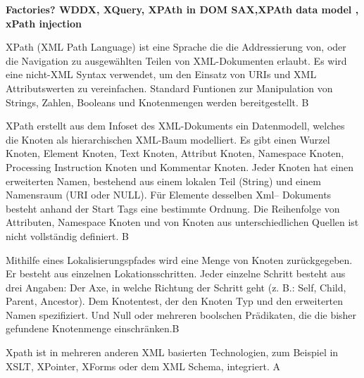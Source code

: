 \textbf{Factories? WDDX, XQuery, XPAth in DOM SAX,XPAth data model , xPath injection}

XPath (XML Path Language) ist eine Sprache die die Addressierung von, oder die Navigation zu ausgewählten Teilen von XML-Dokumenten erlaubt. Es wird eine nicht-XML Syntax verwendet, um den Einsatz von URIs und XML Attributswerten zu vereinfachen. Standard Funtionen zur Manipulation von Strings, Zahlen, Booleans und Knotenmengen werden bereitgestellt. B

XPath erstellt aus dem Infoset des XML-Dokuments ein Datenmodell, welches die Knoten als hierarchischen XML-Baum modelliert. Es gibt einen Wurzel Knoten, Element Knoten, Text Knoten, Attribut Knoten, Namespace Knoten, Processing Instruction Knoten und Kommentar Knoten. Jeder Knoten hat einen erweiterten Namen, bestehend aus einem lokalen Teil (String) und einem Namensraum (URI oder NULL). Für Elemente desselben Xml-- Dokuments besteht anhand der Start Tags eine bestimmte Ordnung. Die Reihenfolge von Attributen, Namespace Knoten und von Knoten aus unterschiedlichen Quellen ist nicht vollständig definiert. B

Mithilfe eines Lokalisierungspfades wird eine Menge von Knoten zurückgegeben. Er besteht aus einzelnen Lokationsschritten. Jeder einzelne Schritt besteht aus drei Angaben: Der Axe, in welche Richtung der Schritt geht (z. B.: Self, Child, Parent, Ancestor). Dem Knotentest, der den Knoten Typ und den erweiterten Namen spezifiziert. Und Null oder mehreren boolschen Prädikaten, die die bisher gefundene Knotenmenge einschränken.B

Xpath ist in mehreren anderen XML basierten Technologien, zum Beispiel in XSLT, XPointer, XForms oder dem XML Schema, integriert. A






